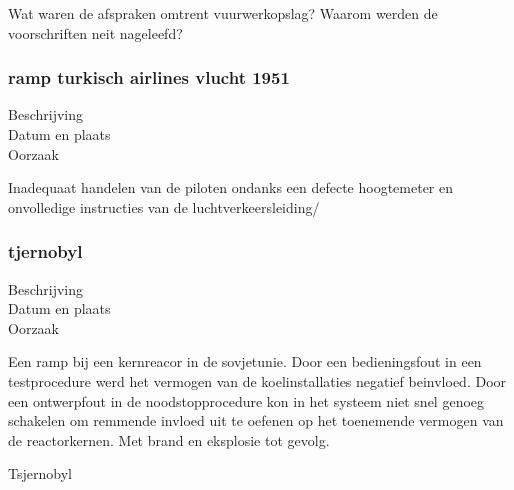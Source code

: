 \cite{boogers092002RampenRegelsRichtlijnen}

Wat waren de afspraken omtrent vuurwerkopslag?
Waarom werden de voorschriften neit nageleefd?
\subsubsection{ramp turkisch airlines vlucht 1951}

\begin{description}
	\item[Beschrijving]
	\item[Datum en plaats] 
	\item[Oorzaak]
\end{description}
Inadequaat handelen van de piloten ondanks een defecte hoogtemeter en onvolledige instructies van de luchtverkeersleiding/

\cite{catsr25022009Boeing737AmsterdamCrash}

\cite{zuilen23022019Tijdlijnpoldercrash}
\cite{wikinews04032009techfoutailines1951}
\cite{luchtvaartnieuws21012020boeing737conclusies}
\cite{adformatie280220209communicatiegebreken}
\cite{spinnael25022009onderzoekpolderbaancrash}
\cite{crashTurkishAirlines}
\cite{flightradar24}
\cite{flightstatstracker}


\subsubsection{tjernobyl}

\begin{description}
	\item[Beschrijving]
	\item[Datum en plaats] 
	\item[Oorzaak]
\end{description}
Een ramp bij een kernreacor in de sovjetunie. Door een bedieningsfout in een testprocedure werd het vermogen van de koelinstallaties negatief beinvloed. Door een ontwerpfout in de noodstopprocedure kon in het systeem niet snel genoeg schakelen om remmende invloed uit te oefenen op het toenemende vermogen van de reactorkernen. Met brand en eksplosie tot gevolg.

\cite{INSAVienna1992Chernobyl}
Tsjernobyl



\cite{wikiTjernobyl}

